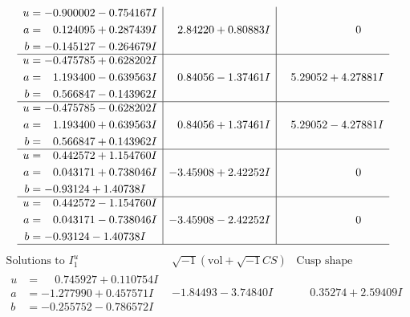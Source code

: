 \documentclass[1p]{elsarticle_modified}
\theoremstyle{definition}
\newcommand{\I}{\sqrt{-1}}
\begin{document}
$$\begin{array}{c|c|c}
\begin{aligned}
u &= -0.900002 - 0.754167 I \\
a &= \phantom{-}0.124095 + 0.287439 I \\
b &= -0.145127 - 0.264679 I\end{aligned}
 & \phantom{-}2.84220 + 0.80883 I & \phantom{-0.000000 } 0 \\ \hline\begin{aligned}
u &= -0.475785 + 0.628202 I \\
a &= \phantom{-}1.193400 - 0.639563 I \\
b &= \phantom{-}0.566847 - 0.143962 I\end{aligned}
 & \phantom{-}0.84056 - 1.37461 I & \phantom{-}5.29052 + 4.27881 I \\ \hline\begin{aligned}
u &= -0.475785 - 0.628202 I \\
a &= \phantom{-}1.193400 + 0.639563 I \\
b &= \phantom{-}0.566847 + 0.143962 I\end{aligned}
 & \phantom{-}0.84056 + 1.37461 I & \phantom{-}5.29052 - 4.27881 I \\ \hline\begin{aligned}
u &= \phantom{-}0.442572 + 1.154760 I \\
a &= \phantom{-}0.043171 + 0.738046 I \\
b &= -0.93124 + 1.40738 I\end{aligned}
 & -3.45908 + 2.42252 I & \phantom{-0.000000 } 0 \\ \hline\begin{aligned}
u &= \phantom{-}0.442572 - 1.154760 I \\
a &= \phantom{-}0.043171 - 0.738046 I \\
b &= -0.93124 - 1.40738 I\end{aligned}
 & -3.45908 - 2.42252 I & \phantom{-0.000000 } 0\\
 \hline 
 \end{array}$$\newpage$$\begin{array}{c|c|c}  
\text{Solutions to }I^u_{1}& \I (\text{vol} + \sqrt{-1}CS) & \text{Cusp shape}\\
 \hline 
\begin{aligned}
u &= \phantom{-}0.745927 + 0.110754 I \\
a &= -1.277990 + 0.457571 I \\
b &= -0.255752 - 0.786572 I\end{aligned}
 & -1.84493 - 3.74840 I & \phantom{-}0.35274 + 2.59409 I \\ \hline\begin{aligned}

\end{aligned}
\end{array}$$
\end{document}
